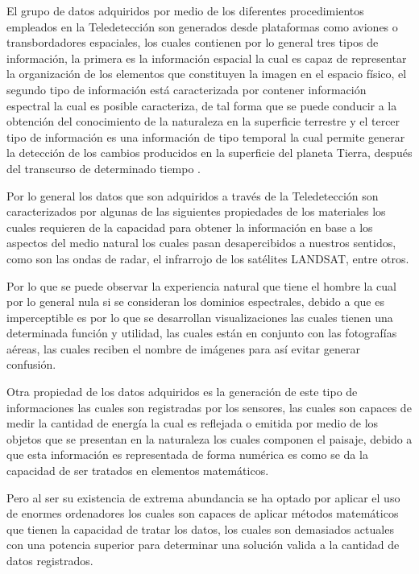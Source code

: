 El grupo de datos adquiridos por medio de los diferentes procedimientos empleados en la Teledetección son generados desde plataformas como aviones o transbordadores espaciales, los cuales contienen por lo general tres tipos de información, la primera es la información espacial la cual es capaz de representar la organización de los elementos que constituyen la imagen en el espacio físico, el segundo tipo de información está caracterizada por contener información espectral la cual es posible caracteriza, de tal forma que se puede conducir a la obtención del conocimiento de la naturaleza en la superficie terrestre y el tercer tipo de información es una información de tipo temporal la cual permite generar la detección de los cambios producidos en la superficie del planeta Tierra, después del transcurso de determinado tiempo \cite{SacristanRomero}.

Por lo general los datos que son adquiridos a través de la Teledetección son caracterizados por algunas de las siguientes propiedades de los materiales los cuales requieren de la capacidad para obtener la información en base a los aspectos del medio natural los cuales pasan desapercibidos a nuestros sentidos, como son las ondas de radar, el infrarrojo de los satélites LANDSAT, entre otros.


Por lo que se puede observar la experiencia natural que tiene el hombre la cual por lo general nula si se consideran los dominios espectrales, debido a que es imperceptible es por lo que se desarrollan visualizaciones las cuales tienen una determinada función y utilidad, las cuales están en conjunto con las fotografías aéreas, las cuales reciben el nombre de imágenes para así evitar generar confusión.

Otra propiedad de los datos adquiridos es la generación de este tipo de informaciones las cuales son registradas por los sensores, las cuales son capaces de medir la cantidad de energía la cual es reflejada o emitida por medio de los objetos que se presentan en la naturaleza los cuales componen el paisaje, debido a que esta información es representada de forma numérica es como se da la capacidad de ser tratados en elementos matemáticos. 

Pero al ser su existencia de extrema abundancia se ha optado por aplicar el uso de enormes ordenadores los cuales son capaces de aplicar métodos matemáticos que tienen la capacidad de tratar los datos, los cuales son demasiados actuales con una potencia superior para determinar una solución valida a la cantidad de datos registrados.

